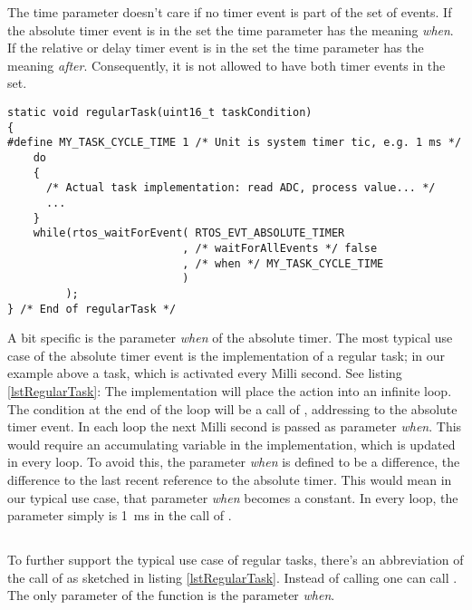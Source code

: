 The time parameter doesn't care if no timer event is part of the set of
events. If the absolute timer event is in the set the time parameter has
the meaning \emph{when}. If the relative or delay timer event is in the
set the time parameter has the meaning \emph{after}. Consequently, it is
not allowed to have both timer events in the set.

\begin{lstlisting}[float, caption=Typical use case: regular task,
label=lstRegularTask, captionpos=b]
static void regularTask(uint16_t taskCondition)
{
#define MY_TASK_CYCLE_TIME 1 /* Unit is system timer tic, e.g. 1 ms */
    do
    {
      /* Actual task implementation: read ADC, process value... */
      ...
    }
    while(rtos_waitForEvent( RTOS_EVT_ABSOLUTE_TIMER
                           , /* waitForAllEvents */ false
                           , /* when */ MY_TASK_CYCLE_TIME
                           )
         );
} /* End of regularTask */
\end{lstlisting}

A bit specific is the parameter \emph{when} of the absolute timer. The
most typical use case of the absolute timer event is the implementation of
a regular task; in our example above a task, which is activated every
Milli second. See listing \ref{lstRegularTask}: The implementation will
place the action into an infinite loop. The  condition at the
end of the loop will be a call of , addressing
to the absolute timer event. In each loop the next Milli second is passed
as parameter \emph{when}. This would require an accumulating variable in
the implementation, which is updated in every loop. To avoid this, the
parameter \emph{when} is defined to be a difference, the difference to the
last recent reference to the absolute timer. This would mean in our typical
use case, that parameter \emph{when} becomes a constant. In every loop,
the parameter simply is 1~ms in the call of .


\subsection{}

To further support the typical use case of regular tasks, there's an
abbreviation of the call of  as sketched in
listing \ref{lstRegularTask}. Instead of calling
 one can call .
The only parameter of the function is the parameter \emph{when}.


